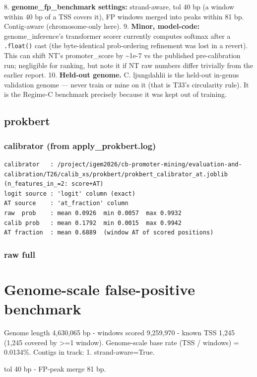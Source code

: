 \documentclass[10pt]{article}
\begin{document}
8. \textbf{genome\_fp\_benchmark settings:} strand-aware, tol 40 bp (a window within 40 bp of a TSS covers
it), FP windows merged into peaks within 81 bp. Contig-aware (chromosome-only here).
9. \textbf{Minor, model-code:} genome\_inference's transformer scorer currently computes softmax after a
\texttt{.float()} cast (the byte-identical prob-ordering refinement was lost in a revert). This can shift
NT's promoter\_score by \textasciitilde{}1e-7 vs the published pre-calibration run; negligible for ranking, but note
it if NT raw numbers differ trivially from the earlier report.
10. \textbf{Held-out genome.} C. ljungdahlii is the held-out in-genus validation genome --- never train or
mine on it (that is T33's circularity rule). It is the Regime-C benchmark precisely because it was
kept out of training.


\subsection*{prokbert}

\subsubsection*{calibrator (from apply\_prokbert.log)}
\begin{verbatim}
calibrator   : /project/igem2026/cb-promoter-mining/evaluation-and-calibration/T26/calib_xs/prokbert/prokbert_calibrator_at.joblib  (n_features_in_=2: score+AT)
logit source : 'logit' column (exact)
AT source    : 'at_fraction' column
raw  prob    : mean 0.0926  min 0.0057  max 0.9932
calib prob   : mean 0.1792  min 0.0015  max 0.9942
AT fraction  : mean 0.6889  (window AT of scored positions)
\end{verbatim}

\subsubsection*{raw \textperiodcentered{} full}
\section*{Genome-scale false-positive benchmark}

Genome length 4,630,065 bp - windows scored 9,259,970 - known TSS 1,245 (1,245 covered by >=1 window). Genome-scale base rate (TSS / windows) = 0.0134\%. Contigs in track: 1. strand-aware=True.

tol 40 bp - FP-peak merge 81 bp.
\end{document}
